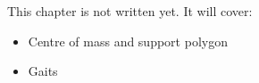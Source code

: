 \label{ch:k13}
\begin{keyidea}
This chapter is not written yet. It will cover:
\begin{itemize}[nosep]
  \item Centre of mass and support polygon
  \item Gaits
\end{itemize}
\end{keyidea}
